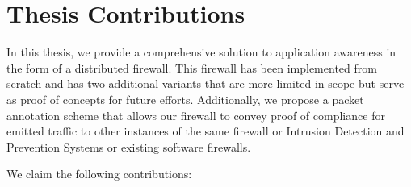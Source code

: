 \section{Thesis Contributions}
\label{intro:contributions}

In this thesis, we provide a comprehensive solution to application awareness
in the form of a distributed firewall. This firewall has been implemented from
scratch and has two additional variants that are more limited in scope but serve
as proof of concepts for future efforts. Additionally, we propose a packet
annotation scheme that allows our firewall to convey proof of compliance for
emitted traffic to other instances of the same firewall or Intrusion Detection
and Prevention Systems or existing software firewalls.

We claim the following contributions:

